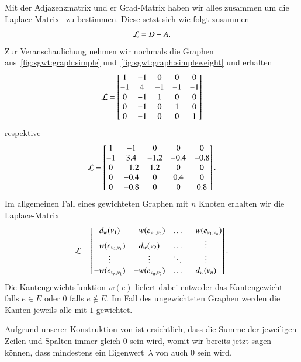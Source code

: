 Mit der Adjazenzmatrix und er Grad-Matrix haben wir alles zusammen um die 
Laplace-Matrix~\laplaceL{} zu bestimmen. Diese setzt sich wie folgt zusammen
\begin{equation}
\laplaceL = \degreeM - \adjacencyM.
\label{eq:sgwt:laplace}
\end{equation}
Zur Veranschaulichung nehmen wir nochmals die Graphen 
aus~\cref{fig:sgwt:graph:simple} und~\cref{fig:sgwt:graph:simpleweight} und 
erhalten
\begin{equation*}
\laplaceL =
\begin{bmatrix}
1 & -1 & 0 & 0 & 0 \\
-1 & 4 & -1 & -1 & -1 \\
0 & -1 & 1 & 0 & 0 \\
0 & -1 & 0 & 1 & 0 \\
0 & -1 & 0 & 0 & 1
\end{bmatrix}
\end{equation*}
respektive
\begin{equation*}
\laplaceL =
\begin{bmatrix}
1 & -1 & 0 & 0 & 0 \\
-1 & 3.4 & -1.2 & -0.4 & -0.8 \\
0 & -1.2 & 1.2 & 0 & 0 \\
0 & -0.4 & 0 & 0.4 & 0 \\
0 & -0.8 & 0 & 0 & 0.8
\end{bmatrix}.
\end{equation*}
Im allgemeinen Fall eines gewichteten Graphen mit $n$ Knoten erhalten wir die 
Laplace-Matrix
\begin{equation*}
\laplaceL =
\begin{bmatrix}
d_w(v_1) & -w(e_{v_1, v_2}) & \dotso & -w(e_{v_1, v_n}) \\
-w(e_{v_2, v_1}) & d_w(v_2) & \dotso & \vdots \\
\vdots & \vdots & \ddots &  \vdots \\
-w(e_{v_n, v_1}) & -w(e_{v_n, v_2}) & \dotso & d_w(v_n)
\end{bmatrix}.
\end{equation*}
Die Kantengewichtsfunktion $w(e)$ liefert dabei entweder das Kantengewicht 
falls $e \in E$ oder $0$ falls $e \notin E$. Im Fall des ungewichteten Graphen 
werden die Kanten jeweils alle mit $1$ gewichtet.

Aufgrund unserer Konstruktion von \laplaceL{} ist ersichtlich, dass die Summe 
der jeweiligen Zeilen und Spalten immer gleich $0$ sein wird, womit wir bereits 
jetzt sagen k\"onnen, dass mindestens ein Eigenwert~$\lambda$ von \laplaceL{} 
auch $0$ sein wird.

